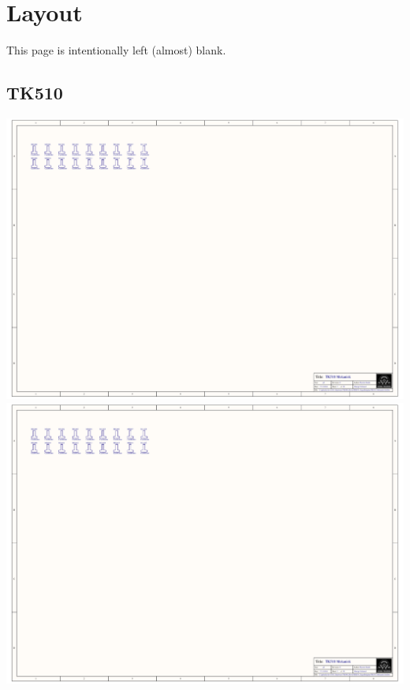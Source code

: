 \section{Layout}
\label{sec:layout}
\begin{center}
\vspace*{\fill}
This page is intentionally left (almost) blank.
\vspace*{\fill}
\end{center}

\centering
\subsection{TK510}
\includegraphics[page=6,angle=270,height=\textheight,width=\textwidth,keepaspectratio]{TK510_Signalbakplan.PDF}
\includegraphics[page=7,angle=270,height=\textheight,width=\textwidth,keepaspectratio]{TK510_Signalbakplan.PDF}
